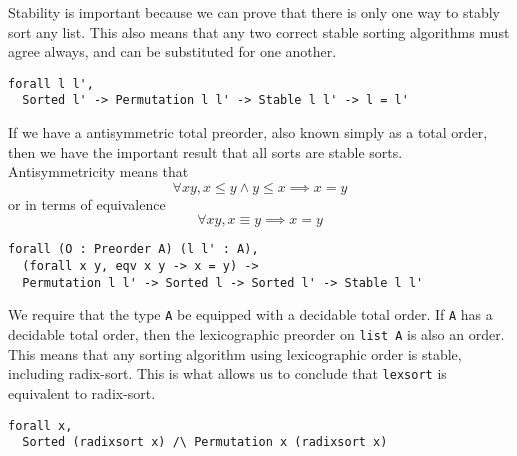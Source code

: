 \documentclass[11pt]{article}
\begin{document}
Stability is important because we can prove that there is only one way
to stably sort any list. This also means that any two correct stable
sorting algorithms must agree always, and can be substituted for one another.

\begin{theorem}[StableUnique]
\begin{verbatim}
forall l l',
  Sorted l' -> Permutation l l' -> Stable l l' -> l = l'
\end{verbatim}
\end{theorem}

If we have a antisymmetric total preorder, also known simply as a
total order, then we have the important result that all sorts are
stable sorts. Antisymmetricity means that
\begin{equation*}
  \forall x y, x \leq y \wedge y \leq x \implies x = y
\end{equation*}
or in terms of equivalence
\begin{equation*}
  \forall x y, x \equiv y \implies x = y
\end{equation*}

\begin{theorem}[OrderStable]
\begin{verbatim}
forall (O : Preorder A) (l l' : A),
  (forall x y, eqv x y -> x = y) ->
  Permutation l l' -> Sorted l -> Sorted l' -> Stable l l'
\end{verbatim}
\end{theorem}

We require that the type \verb|A| be equipped with a decidable total
order. If \verb|A| has a decidable total order, then the lexicographic
preorder on \verb|list A| is also an order. This means that any
sorting algorithm using lexicographic order is stable, including
radix-sort. This is what allows us to conclude that \verb|lexsort| is
equivalent to radix-sort.

\begin{theorem}
\begin{verbatim}
forall x,
  Sorted (radixsort x) /\ Permutation x (radixsort x)
\end{verbatim}
\end{theorem}

\printbibliography{}
\end{document}
